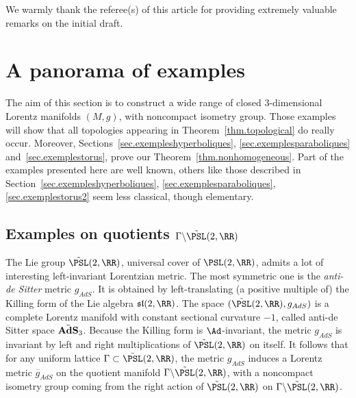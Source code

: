 We warmly thank the referee(s) of this article for providing extremely valuable remarks on the initial draft.

\section{A panorama of examples}\label{sec.panorama}

The aim of this section is to construct a wide range of closed $3$-dimensional Lorentz manifolds $(M,g)$, with noncompact isometry group. Those examples will show that all topologies appearing in Theorem~\ref{thm.topological} do really occur. Moreover, Sections~\ref{sec.exempleshyperboliques}, \ref{sec.exemplesparaboliques} and~\ref{sec.exemplestorus}, prove our Theorem~\ref{thm.nonhomogeneous}. Part of the examples presented here are well known, others like those described in Section~\ref{sec.exempleshyperboliques}, \ref{sec.exemplesparaboliques}, \ref{sec.exemplestorus2} seem less classical, though elementary.


\subsection{Examples on quotients \texorpdfstring{$\Gamma \backslash \tilde{\PSL}(2,\RR)$}{Gamma backslash PSL(2, RR)}}\label{sec.exemplessl2}

The Lie group $\tilde{\PSL}(2,\RR)$, universal cover of ${\PSL}(2,\RR)$, admits a lot of interesting left-invariant Lorentzian metric. The most symmetric one is the \emph{anti-de Sitter} metric $g_{AdS}$. It is obtained by left-translating (a positive multiple of) the Killing form of the Lie algebra $\mathfrak{sl}(2,\RR)$. The space $(\tilde{\PSL}(2,\RR),g_{AdS})$ is a complete Lorentz manifold with constant sectional curvature $-1$, called anti-de Sitter space $\tilde{\bf{AdS}}_3$. Because the Killing form is $\Ad$-invariant, the metric $g_{AdS}$ is invariant by left and right multiplications of $\tilde{\PSL}(2,\RR)$ on itself. It follows that for any uniform lattice $\Gamma \subset \tilde{\PSL}(2,\RR)$, the metric $g_{AdS}$ induces a Lorentz metric $\overline{g}_{AdS}$ on the quotient manifold $\Gamma \backslash \tilde{\PSL}(2,\RR)$, with a noncompact isometry group coming from the right action of $\tilde{\PSL}(2,\RR)$ on $\Gamma \backslash \tilde{\PSL}(2,\RR)$.

